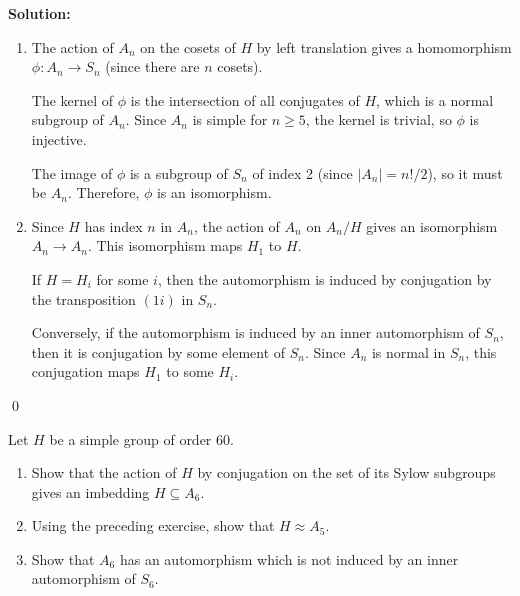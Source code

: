 \noindent\textbf{Solution:}
\begin{enumerate}[label=(\alph*)]
\item The action of $A_n$ on the cosets of $H$ by left translation gives a homomorphism $\phi: A_n \to S_n$ (since there are $n$ cosets).

The kernel of $\phi$ is the intersection of all conjugates of $H$, which is a normal subgroup of $A_n$. Since $A_n$ is simple for $n \geq 5$, the kernel is trivial, so $\phi$ is injective.

The image of $\phi$ is a subgroup of $S_n$ of index 2 (since $|A_n| = n!/2$), so it must be $A_n$. Therefore, $\phi$ is an isomorphism.

\item Since $H$ has index $n$ in $A_n$, the action of $A_n$ on $A_n/H$ gives an isomorphism $A_n \to A_n$. This isomorphism maps $H_1$ to $H$.

If $H = H_i$ for some $i$, then the automorphism is induced by conjugation by the transposition $(1i)$ in $S_n$.

Conversely, if the automorphism is induced by an inner automorphism of $S_n$, then it is conjugation by some element of $S_n$. Since $A_n$ is normal in $S_n$, this conjugation maps $H_1$ to some $H_i$.
\end{enumerate}


\qed
\begin{problembox}
Let $H$ be a simple group of order 60.
\begin{enumerate}[label=(\alph*)]
\item Show that the action of $H$ by conjugation on the set of its Sylow subgroups gives an imbedding $H \subseteq A_6$.
\item Using the preceding exercise, show that $H \approx A_5$.
\item Show that $A_6$ has an automorphism which is not induced by an inner automorphism of $S_6$.
\end{enumerate}
\end{problembox}

